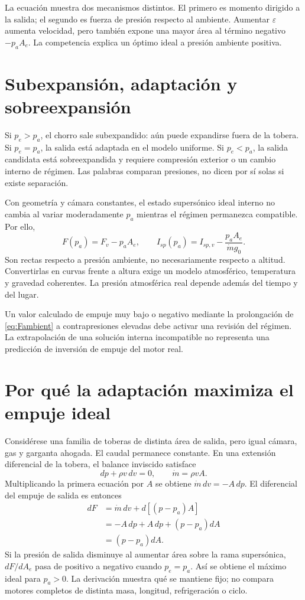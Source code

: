 La ecuación muestra dos mecanismos distintos. El primero es momento dirigido a la salida; el segundo es fuerza de presión respecto al ambiente. Aumentar $\varepsilon$ aumenta velocidad, pero también expone una mayor área al término negativo $-p_aA_e$. La competencia explica un óptimo ideal a presión ambiente positiva.
\section{Subexpansión, adaptación y sobreexpansión}
Si $p_e>p_a$, el chorro sale subexpandido: aún puede expandirse fuera de la tobera. Si $p_e=p_a$, la salida está adaptada en el modelo uniforme. Si $p_e<p_a$, la salida candidata está sobreexpandida y requiere compresión exterior o un cambio interno de régimen. Las palabras comparan presiones, no dicen por sí solas si existe separación.

Con geometría y cámara constantes, el estado supersónico ideal interno no cambia al variar moderadamente $p_a$ mientras el régimen permanezca compatible. Por ello,
\begin{equation}\label{eq:Fambient}
 F(p_a)=F_v-p_aA_e,\qquad
 I_{sp}(p_a)=I_{sp,v}-\frac{p_aA_e}{\dot m g_0}.
\end{equation}
Son rectas respecto a presión ambiente, no necesariamente respecto a altitud. Convertirlas en curvas frente a altura exige un modelo atmosférico, temperatura y gravedad coherentes. La presión atmosférica real depende además del tiempo y del lugar.

Un valor calculado de empuje muy bajo o negativo mediante la prolongación de \eqref{eq:Fambient} a contrapresiones elevadas debe activar una revisión del régimen. La extrapolación de una solución interna incompatible no representa una predicción de inversión de empuje del motor real.
\section{Por qué la adaptación maximiza el empuje ideal}
Considérese una familia de toberas de distinta área de salida, pero igual cámara, gas y garganta ahogada. El caudal permanece constante. En una extensión diferencial de la tobera, el balance inviscido satisface
\[
 dp+\rho v\,dv=0,\qquad \dot m=\rho vA.
\]
Multiplicando la primera ecuación por $A$ se obtiene $\dot m\,dv=-A\,dp$. El diferencial del empuje de salida es entonces
\begin{align}
 dF&=\dot m\,dv+d[(p-p_a)A]\\
 &=-A\,dp+A\,dp+(p-p_a)dA\\
 &=(p-p_a)dA.
\end{align}
Si la presión de salida disminuye al aumentar área sobre la rama supersónica, $dF/dA_e$ pasa de positivo a negativo cuando $p_e=p_a$. Así se obtiene el máximo ideal para $p_a>0$. La derivación muestra qué se mantiene fijo; no compara motores completos de distinta masa, longitud, refrigeración o ciclo.

